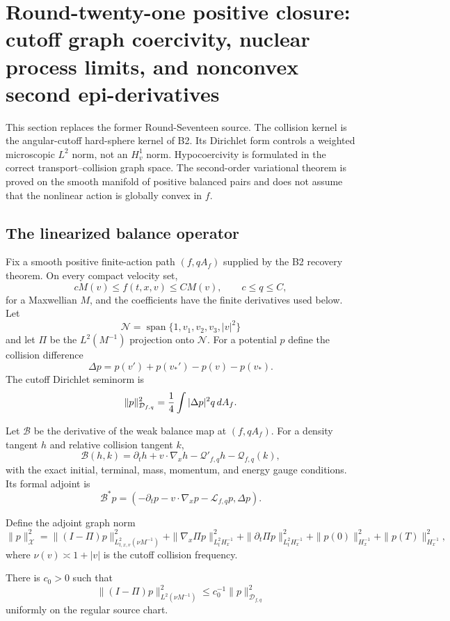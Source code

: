 \section{Round-twenty-one positive closure: cutoff graph coercivity, nuclear process limits, and nonconvex second epi-derivatives}
\label{sec:r21-b3}

This section replaces the former Round-Seventeen source.  The collision kernel
is the angular-cutoff hard-sphere kernel of B2.  Its Dirichlet form controls a
weighted microscopic $L^2$ norm, not an $H^1_v$ norm.  Hypocoercivity is
formulated in the correct transport--collision graph space.  The second-order
variational theorem is proved on the smooth manifold of positive balanced
pairs and does not assume that the nonlinear action is globally convex in
$f$.

\subsection{The linearized balance operator}

Fix a smooth positive finite-action path $(f,qA_f)$ supplied by the B2
recovery theorem.  On every compact velocity set,
\[
 cM(v)\le f(t,x,v)\le CM(v),
 \qquad c\le q\le C,
\]
for a Maxwellian $M$, and the coefficients have the finite derivatives used
below.  Let
\[
 \mathcal N=\operatorname{span}\{1,v_1,v_2,v_3,|v|^2\}
\]
and let $\Pi$ be the $L^2(M^{-1})$ projection onto $\mathcal N$.  For a
potential $p$ define the collision difference
\[
 \Delta p=p(v')+p(v_*')-p(v)-p(v_*).
\]
The cutoff Dirichlet seminorm is
\[
 \|p\|_{\mathcal D_{f,q}}^2=
 {1\over4}\int|\Delta p|^2q\,dA_f.
\]

Let $\mathcal B$ be the derivative of the weak balance map at $(f,qA_f)$.
For a density tangent $h$ and relative collision tangent $k$,
\[
 \mathcal B(h,k)=
 \partial_th+v\cdot\nabla_xh-\mathcal Q'_{f,q}h-\mathcal Q_{f,q}(k),
\]
with the exact initial, terminal, mass, momentum, and energy gauge conditions.
Its formal adjoint is
\[
 \mathcal B^*p=
 \left(-\partial_tp-v\cdot\nabla_xp-\mathcal L_{f,q}p,
       \Delta p\right).
\]

Define the adjoint graph norm
\[
 \|p\|_{\mathcal X}^2=
 \|(I-\Pi)p\|_{L^2_{t,x,v}(\nu M^{-1})}^2
 +\|\nabla_x\Pi p\|_{L^2_tH^{-1}_x}^2
 +\|\partial_t\Pi p\|_{L^2_tH^{-1}_x}^2
 +\|p(0)\|_{H^{-1}_x}^2+\|p(T)\|_{H^{-1}_x}^2,
\]
where $\nu(v)\asymp1+|v|$ is the cutoff collision frequency.

\begin{lemma}
\label{lem:r21-b3-gap}
There is $c_0>0$ such that
\[
 \|(I-\Pi)p\|_{L^2(\nu M^{-1})}^2
 \le c_0^{-1}\|p\|_{\mathcal D_{f,q}}^2
\]
uniformly on the regular source chart.
\end{lemma}

